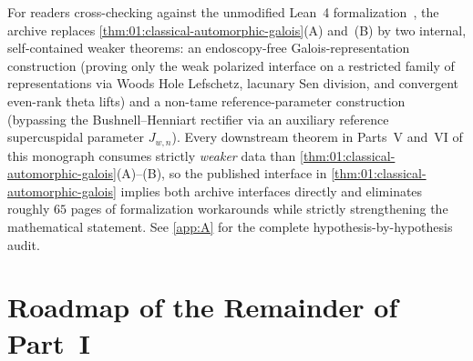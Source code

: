 \begin{remark}
For readers cross-checking against the unmodified Lean~4 formalization~\cite{Alpoge2026}, the archive replaces \cref{thm:01:classical-automorphic-galois}(A) and~(B) by two internal, self-contained weaker theorems: an endoscopy-free Galois-representation construction (proving only the weak polarized interface on a restricted family of representations via Woods Hole Lefschetz, lacunary Sen division, and convergent even-rank theta lifts) and a non-tame reference-parameter construction (bypassing the Bushnell--Henniart rectifier via an auxiliary reference supercuspidal parameter $J_{w,n}$). Every downstream theorem in Parts~V and~VI of this monograph consumes strictly \emph{weaker} data than \cref{thm:01:classical-automorphic-galois}(A)--(B), so the published interface in \cref{thm:01:classical-automorphic-galois} implies both archive interfaces directly and eliminates roughly $65$ pages of formalization workarounds while strictly strengthening the mathematical statement. See \cref{app:A} for the complete hypothesis-by-hypothesis audit.
\end{remark}

\section{Roadmap of the Remainder of Part~I}
\label{sec:01:roadmap}

